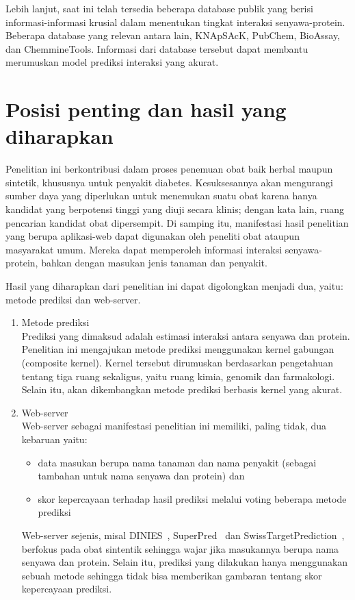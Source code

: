 Lebih lanjut, saat ini telah tersedia beberapa database publik yang berisi informasi-informasi krusial dalam menentukan tingkat interaksi senyawa-protein.
Beberapa database yang relevan antara lain, KNApSAcK, PubChem, BioAssay, dan ChemmineTools.
Informasi dari database tersebut dapat membantu merumuskan model prediksi interaksi yang akurat.

\section{Posisi penting dan hasil yang diharapkan}
Penelitian ini berkontribusi dalam proses penemuan obat baik herbal maupun sintetik, khususnya untuk penyakit diabetes.
Kesuksesannya akan mengurangi sumber daya yang diperlukan untuk menemukan suatu obat karena hanya kandidat yang berpotensi tinggi yang diuji secara klinis; dengan kata lain, ruang pencarian kandidat obat dipersempit.
Di samping itu, manifestasi hasil penelitian yang berupa aplikasi-web dapat digunakan oleh peneliti obat ataupun masyarakat umum.
Mereka dapat memperoleh informasi interaksi senyawa-protein, bahkan dengan masukan jenis tanaman dan penyakit.

Hasil yang diharapkan dari penelitian ini dapat digolongkan menjadi dua, yaitu: metode prediksi dan web-server.
\begin{enumerate} [topsep=0mm]
\itemsep0mm
\item Metode prediksi \\
Prediksi yang dimaksud adalah estimasi interaksi antara senyawa dan protein.
Penelitian ini mengajukan metode prediksi menggunakan kernel gabungan (composite kernel).
Kernel tersebut dirumuskan berdasarkan pengetahuan tentang tiga ruang sekaligus, 
yaitu ruang kimia, genomik dan farmakologi.
Selain itu, akan dikembangkan metode prediksi berbasis kernel yang akurat.

\item Web-server \\
Web-server sebagai manifestasi penelitian ini memiliki, paling tidak, dua kebaruan yaitu:
\begin{itemize} [topsep=0mm]
\itemsep0mm
\item data masukan berupa nama tanaman dan nama penyakit (sebagai tambahan untuk nama senyawa dan protein) dan 
\item skor kepercayaan terhadap hasil prediksi melalui voting beberapa metode prediksi
\end{itemize}
Web-server sejenis, misal DINIES~\cite{YamanishiKMSKG14}, SuperPred~\cite{NickelGEBRGDP14} dan SwissTargetPrediction~\cite{GfellerGWDMZ14}, berfokus pada obat sintentik sehingga wajar jika masukannya berupa nama senyawa dan protein.
Selain itu, prediksi yang dilakukan hanya menggunakan sebuah metode sehingga tidak bisa memberikan gambaran tentang skor kepercayaan prediksi.
\end{enumerate}

